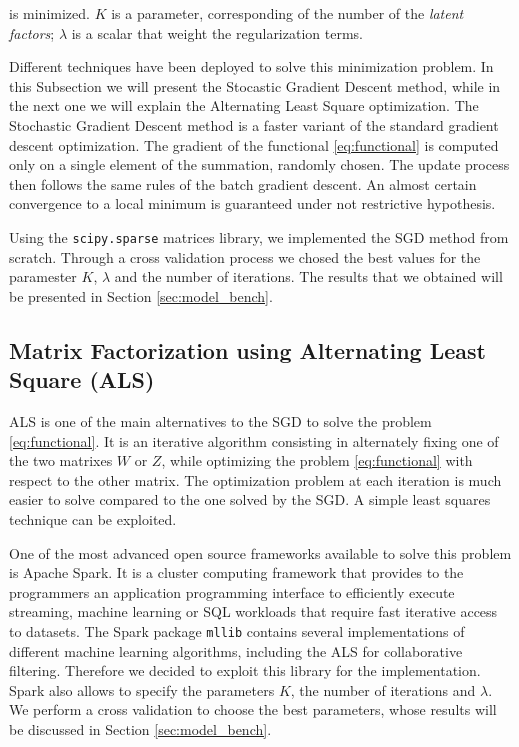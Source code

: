 \documentclass[10pt,conference,compsocconf]{IEEEtran}
\begin{document}
is minimized. $K$ is a parameter,
corresponding of the number of the \textit{latent factors}; $\lambda$ is a scalar 
that weight the regularization terms.

Different techniques have been deployed to solve this minimization problem. In this Subsection we
will present the Stocastic Gradient Descent method, while in the next one we will explain the
Alternating Least Square optimization. 
The Stochastic Gradient Descent method is a faster variant of the standard gradient descent
optimization. The gradient of the functional \ref{eq:functional} is computed only on a single
element of the summation, randomly chosen. The update process then follows the same rules of the batch
gradient descent.
An almost certain convergence to a local minimum is guaranteed under not restrictive hypothesis.

Using the \texttt{scipy.sparse} matrices library, we implemented the SGD method from scratch.
Through a cross validation process we chosed the best values for the paramester $K$, $\lambda$ and
the number of iterations. The results that we obtained will be presented in Section
\ref{sec:model_bench}.

\subsection{Matrix Factorization using Alternating Least Square (ALS)}
ALS is one of the main alternatives to the SGD to solve the problem \ref{eq:functional}.
It is an iterative algorithm consisting in alternately fixing one of the two matrixes $W$ or $Z$,
while optimizing the problem \ref{eq:functional} with respect to the other matrix.
The optimization problem at each iteration is much easier to solve compared to the one solved by the
SGD. A simple least squares technique can be exploited.

One of the most advanced open source frameworks available to solve this problem is Apache Spark. It
is a cluster computing framework that provides to the programmers an application programming
interface to efficiently execute streaming, machine learning or SQL workloads that require fast
iterative access to datasets.
The Spark package \texttt{mllib} contains several implementations of different machine learning
algorithms, including the ALS for collaborative filtering. Therefore we decided to exploit this
library for the implementation.
Spark also allows to specify the parameters $K$, the number of iterations and $\lambda$. We perform a
cross validation to choose the best parameters, whose results will be discussed in Section 
\ref{sec:model_bench}.
\end{document}
